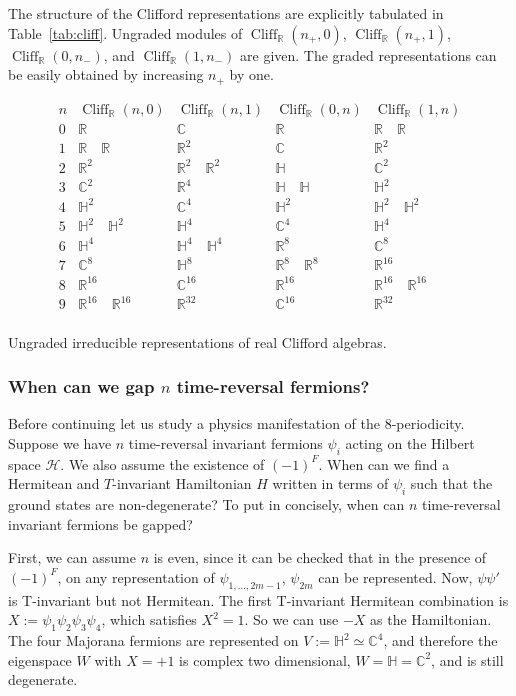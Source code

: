 \documentclass[12pt]{article}
\numberwithin{equation}{section}
\numberwithin{figure}{section}
\theoremstyle{remark}
\renewenvironment{table}[1][]{
  \begin{originaltable}[#1]
    \begin{mdframed}[linecolor=black!0,backgroundcolor=black!1]
}{
    \end{mdframed}
  \end{originaltable}
}
\def\bC{\mathbb{C}}
\def\bH{\mathbb{H}}
\def\bR{\mathbb{R}}
\def\cH{\mathcal{H}}
\def\Cliff{\mathop{\mathrm{Cliff}}\nolimits}
\begin{document}
The structure of the  Clifford representations are explicitly tabulated in Table~\ref{tab:cliff}.
Ungraded modules of $\Cliff_\bR(n_+,0)$,
$\Cliff_\bR(n_+,1)$,
$\Cliff_\bR(0,n_-)$,
and
$\Cliff_\bR(1,n_-)$
are given. The graded representations can be easily obtained by increasing $n_+$ by one.

\begin{table}
\[
\begin{array}{c||c|c||c|c}
n & \Cliff_\bR(n,0) &\Cliff_\bR(n,1) & \Cliff_\bR(0,n) &\Cliff_\bR(1,n)  \\
\hline
0 & \bR &\bC  & \bR & \bR \quad \bR \\
1 & \bR\quad \bR & \bR^2 & \bC & \bR^2 \\
2 & \bR^2 &\bR^2\quad \bR^2& \bH & \bC^2\\
3 & \bC^2 &\bR^4& \bH\quad\bH & \bH^2 \\
4 & \bH^2 &\bC^4& \bH^2 &\bH^2 \quad \bH^2\\
5& \bH^2\quad\bH^2 &\bH^4& \bC^4  & \bH^4\\
6 & \bH^4 &\bH^4\quad\bH^4& \bR^8 & \bC^8\\
7 & \bC^8 &\bH^8& \bR^8 \quad \bR^8  & \bR^{16}\\
\hline
8 &\bR^{16} &\bC^{16}& \bR^{16} & \bR^{16}\quad \bR^{16}\\
9 &\bR^{16}\quad \bR^{16} &\bR^{32}& \bC^{16} &  \bR^{32}\\
\end{array}
\]
\caption{Ungraded irreducible representations of real Clifford algebras. \label{tab:cliff}}
\end{table}


\subsubsection{When can we gap $n$ time-reversal fermions?}

Before continuing let us study a physics manifestation of the $8$-periodicity.
Suppose we have $n$ time-reversal invariant fermions $\psi_i$
acting on the Hilbert space $\cH$.
We also assume the existence of $(-1)^F$.
When can we find a Hermitean and $T$-invariant
 Hamiltonian $H$ written in terms of $\psi_i$
such that the ground states are non-degenerate? 
To put in concisely, when can $n$ time-reversal invariant fermions be gapped?

First, we can assume $n$ is even,
since it can be checked that in the presence of $(-1)^F$, 
on any representation of $\psi_{1,\ldots, 2m-1}$,
$\psi_{2m}$ can be represented.
Now, $\psi \psi'$ is T-invariant but not Hermitean.
The first T-invariant Hermitean combination is $X:=\psi_1\psi_2\psi_3\psi_4$,
which satisfies $X^2=1$.
So we can use $-X$ as the Hamiltonian.
The four Majorana fermions are represented on $V:=\bH^2\simeq \bC^4$,
and therefore the eigenspace $W$ with $X=+1$ is complex two dimensional, $W=\bH=\bC^2$,
and is still degenerate.
\end{document}
